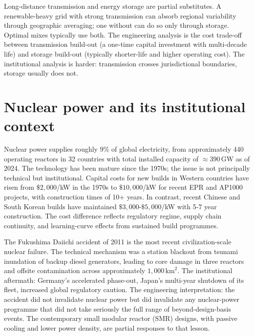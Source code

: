 \begin{principle}
Long-distance transmission and energy storage are partial substitutes. A renewable-heavy grid with strong transmission can absorb regional variability through geographic averaging; one without can do so only through storage. Optimal mixes typically use both. The engineering analysis is the cost trade-off between transmission build-out (a one-time capital investment with multi-decade life) and storage build-out (typically shorter-life and higher operating cost). The institutional analysis is harder: transmission crosses jurisdictional boundaries, storage usually does not.
\end{principle}

\section{Nuclear power and its institutional context}

Nuclear power supplies roughly $9\%$ of global electricity, from approximately 440 operating reactors in 32 countries with total installed capacity of $\approx 390\,\text{GW}$ as of 2024. The technology has been mature since the 1970s; the issue is not principally technical but institutional. Capital costs for new builds in Western countries have risen from $\$2{,}000$/kW in the 1970s to $\$10{,}000$/kW for recent EPR and AP1000 projects, with construction times of 10+ years. In contrast, recent Chinese and South Korean builds have maintained $\$3{,}000$-$\$5{,}000$/kW with 5-7 year construction. The cost difference reflects regulatory regime, supply chain continuity, and learning-curve effects from sustained build programmes.

The Fukushima Daiichi accident of 2011 \cite{acc:tepco-fukushima-2012} is the most recent civilization-scale nuclear failure. The technical mechanism was a station blackout from tsunami inundation of backup diesel generators, leading to core damage in three reactors and offsite contamination across approximately $1{,}000\,\text{km}^2$. The institutional aftermath: Germany's accelerated phase-out, Japan's multi-year shutdown of its fleet, increased global regulatory caution. The engineering interpretation: the accident did not invalidate nuclear power but did invalidate any nuclear-power programme that did not take seriously the full range of beyond-design-basis events. The contemporary small modular reactor (SMR) designs, with passive cooling and lower power density, are partial responses to that lesson.

